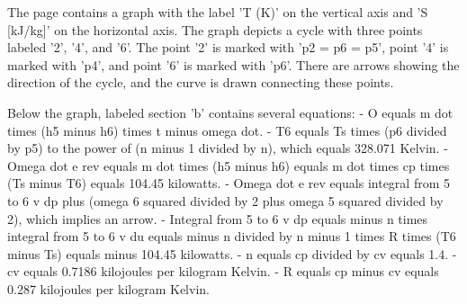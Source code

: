 The page contains a graph with the label 'T (K)' on the vertical axis and 'S [kJ/kg]' on the horizontal axis. The graph depicts a cycle with three points labeled '2', '4', and '6'. The point '2' is marked with 'p2 = p6 = p5', point '4' is marked with 'p4', and point '6' is marked with 'p6'. There are arrows showing the direction of the cycle, and the curve is drawn connecting these points.

Below the graph, labeled section 'b' contains several equations:
- O equals m dot times (h5 minus h6) times t minus omega dot.
- T6 equals Ts times (p6 divided by p5) to the power of (n minus 1 divided by n), which equals 328.071 Kelvin.
- Omega dot e rev equals m dot times (h5 minus h6) equals m dot times cp times (Ts minus T6) equals 104.45 kilowatts.
- Omega dot e rev equals integral from 5 to 6 v dp plus (omega 6 squared divided by 2 plus omega 5 squared divided by 2), which implies an arrow.
- Integral from 5 to 6 v dp equals minus n times integral from 5 to 6 v du equals minus n divided by n minus 1 times R times (T6 minus Ts) equals minus 104.45 kilowatts.
- n equals cp divided by cv equals 1.4.
- cv equals 0.7186 kilojoules per kilogram Kelvin.
- R equals cp minus cv equals 0.287 kilojoules per kilogram Kelvin.
